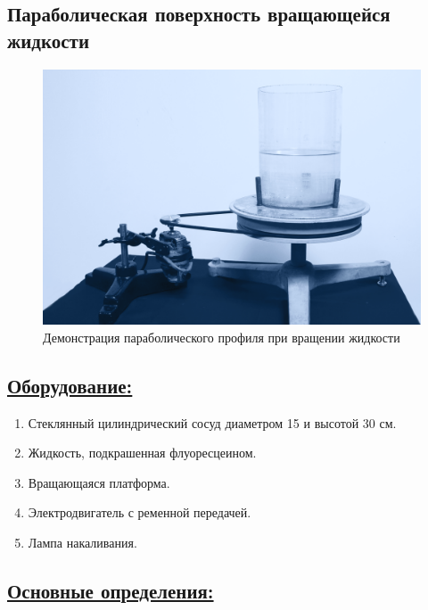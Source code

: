 \documentclass[14pt,a4paper,oneside]{extarticle}	%
\begin{document}

\begin{center}
	\subsection*{Параболическая поверхность вращающейся жидкости}
\end{center}

\begin{figure}[H]
	\centering 	
	\includegraphics[width=0.9\linewidth]{paraboloid-1.png}
	\caption{Демонстрация параболического профиля при вращении жидкости}
	\label{paraboloid-1}
\end{figure}

\subsection*{\underline{Оборудование:}}

\begin{enumerate}
	\item Стеклянный цилиндрический сосуд диаметром 15 и высотой 30 см.
	\item Жидкость, подкрашенная флуоресцеином.
	\item Вращающаяся платформа.
	\item Электродвигатель с ременной передачей.
	\item Лампа накаливания.
\end{enumerate}

\newpage
\subsection*{\underline{Основные определения:}}
\end{document}
